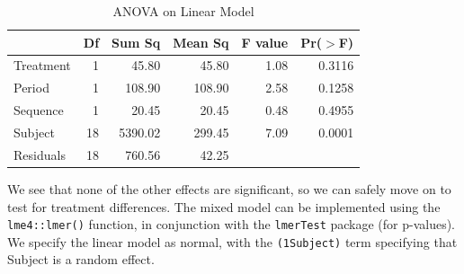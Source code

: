 \begin{table}[ht]
\centering
\begin{tabular}{lrrrrr}
  \toprule
 & Df & Sum Sq & Mean Sq & F value & Pr($>$F) \\ 
  \midrule
Treatment   & 1 & 45.80 & 45.80 & 1.08 & 0.3116 \\ 
  Period      & 1 & 108.90 & 108.90 & 2.58 & 0.1258 \\ 
  Sequence    & 1 & 20.45 & 20.45 & 0.48 & 0.4955 \\ 
  Subject     & 18 & 5390.02 & 299.45 & 7.09 & 0.0001 \\ 
  Residuals   & 18 & 760.56 & 42.25 &  &  \\ 
   \bottomrule
\end{tabular}
\caption{ANOVA on Linear Model} 
\end{table}

We see that none of the other effects are significant, so we can safely
move on to test for treatment differences. The mixed model can be
implemented using the \texttt{lme4::lmer()} function, in conjunction
with the \texttt{lmerTest} package (for p-values). We specify the linear
model as normal, with the \texttt{(1\textbar{}Subject)} term specifying
that Subject is a random effect.

\begin{Shaded}
\begin{Highlighting}[]
\OtherTok{\textless{}{-}} \SpecialCharTok{\textasciitilde{}}\SpecialCharTok{+}\SpecialCharTok{+}\SpecialCharTok{+}\NormalTok{ (} \SpecialCharTok{|}
\end{Highlighting}
\end{Shaded}

